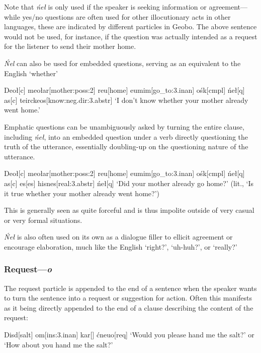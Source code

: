 \documentclass[a4paper,11pt,oneside,openany]{memoir}
\begin{document}
Note that \textit{\'ne\l} is only used if the speaker is seeking information or agreement---while yes/no questions are often used for other illocutionary acts in other languages, these are indicated by different particles in Geobo{\engma}. The above sentence would not be used, for instance, if the question was actually intended as a request for the listener to send their mother home.

\textit{\'Nel} can also be used for embedded questions, serving as an equivalent to the English `whether'

\ex
\begingl
Deo\l[\sc c]
meo\l ar[mother:{\sc poss:2}]
reu[home]
eumim[go\_to:{\sc 3.inan}]
o\'sk[\sc cmpl]
\'ne\l[\sc q]
\nogloss{,}
as[\sc c]
te\vd[\sc 1]
\vt\vl irckeos[know:{\sc neg.dir:3.abstr}]
\glft `I don't know whether your mother already went home.'
\endgl
\xe

Emphatic questions can be unambiguously asked by turning the entire clause, including \textit{\'ne\l}, into an embedded question under a verb directly questioning the truth of the utterance, essentially doubling-up on the questioning nature of the utterance.

\ex
\begingl
Deo\l[\sc c]
meo\l ar[mother:{\sc poss:2}]
reu[home]
eumim[go\_to:{\sc 3.inan}]
o\'sk[\sc cmpl]
\'ne\l[\sc q]
\nogloss{,}
as[\sc c]
es[\sc es]
hisnes[real:{\sc 3.abstr}]
\'ne\l[\sc q]
\glft `Did your mother already go home?' (lit., `Is it true whether your mother already went home?')
\endgl 
\xe

This is generally seen as quite forceful and is thus impolite outside of very casual or very formal situations.

\textit{\'Ne\l} is also often used on its own as a dialogue filler to ellicit agreement or encourage elaboration, much like the English `right?', `uh-huh?', or `really?'

\subsubsection{Request---\textit{\vr o}}\label{sec:ro}

The request particle is appended to the end of a sentence when the speaker wants to turn the sentence into a request or suggestion for action. Often this manifests as it being directly appended to the end of a clause describing the content of the request:

\ex
\begingl
Disd[salt]
\vc om[\sc ins:3.inan]
kar[]
\'cneu\vd[give:{\sc 1}]
\vr o[\sc req]
\glft `Would you please hand me the salt?' or `How about you hand me the salt?'
\endgl
\xe
\end{document}
